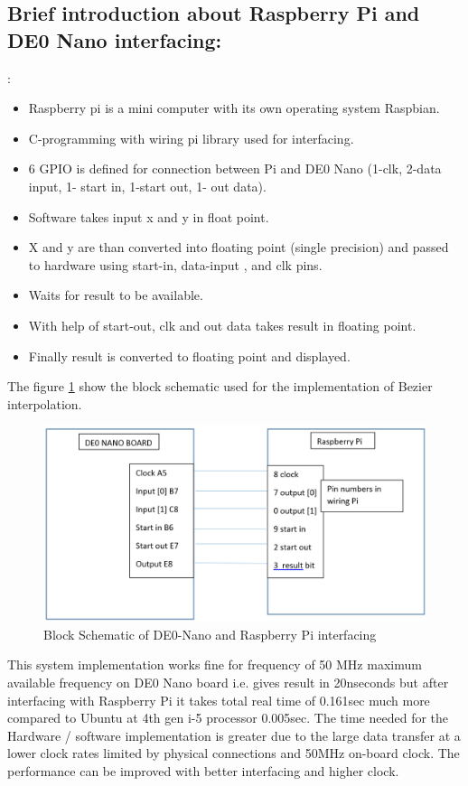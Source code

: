 \subsection{Brief introduction about Raspberry Pi and DE0 Nano interfacing:}:
\begin{itemize}
	\item{Raspberry pi is a mini computer with its own operating system Raspbian.}
	\item{C-programming with wiring pi library used for interfacing.}
	\item{6 GPIO is defined for connection between Pi and DE0 Nano (1-clk, 2-data input, 1- start in, 1-start out, 1- out data).}
	\item{Software takes input x and y in float point.}
	\item{X and y are than converted into floating point (single precision) and passed to hardware using start-in, data-input  , and clk pins.}
	\item{Waits for result to be available.}
	\item{With help of start-out, clk and out data takes result in floating point.}
	\item{Finally result is converted to floating point and displayed.}
\end{itemize}

The figure \ref{DE0Nano_RPI} show the block schematic used for the implementation of Bezier interpolation. 

\begin{figure} [H]
  \centering
   \includegraphics[scale=0.4]{./figs/DeNano_rPi}
  \caption{Block Schematic of DE0-Nano and Raspberry Pi interfacing}
  \label{DE0Nano_RPI}
\end{figure}


This system implementation works fine for frequency of 50 MHz maximum available frequency on DE0 Nano board i.e. gives result in 20nseconds but after interfacing with Raspberry Pi it takes total real time of 0.161sec much more compared to Ubuntu at 4th gen i-5 processor 0.005sec. The time needed for the Hardware / software implementation is greater due to the large data transfer at a lower clock rates limited by physical connections and 50MHz on-board clock. The performance can be improved with better interfacing and higher clock.

